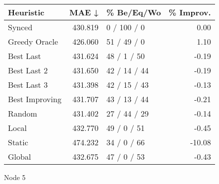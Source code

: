 \begin{tabular}{lrlr}
\toprule
\textbf{Heuristic} & \textbf{MAE ↓} & \textbf{\% Be/Eq/Wo} & \textbf{\% Improv.} \\
\midrule
            Synced &        430.819 &          0 / 100 / 0 &                0.00 \\
     Greedy Oracle &        426.060 &          51 / 49 / 0 &                1.10 \\
         Best Last &        431.624 &          48 / 1 / 50 &               -0.19 \\
       Best Last 2 &        431.650 &         42 / 14 / 44 &               -0.19 \\
       Best Last 3 &        431.398 &         42 / 15 / 43 &               -0.13 \\
    Best Improving &        431.707 &         43 / 13 / 44 &               -0.21 \\
            Random &        431.402 &         27 / 44 / 29 &               -0.14 \\
             Local &        432.770 &          49 / 0 / 51 &               -0.45 \\
            Static &        474.232 &          34 / 0 / 66 &              -10.08 \\
            Global &        432.675 &          47 / 0 / 53 &               -0.43 \\
\bottomrule
\end{tabular}
\caption{Node 5}
\label{tab:iid_lr05_le1_bs2_5}
